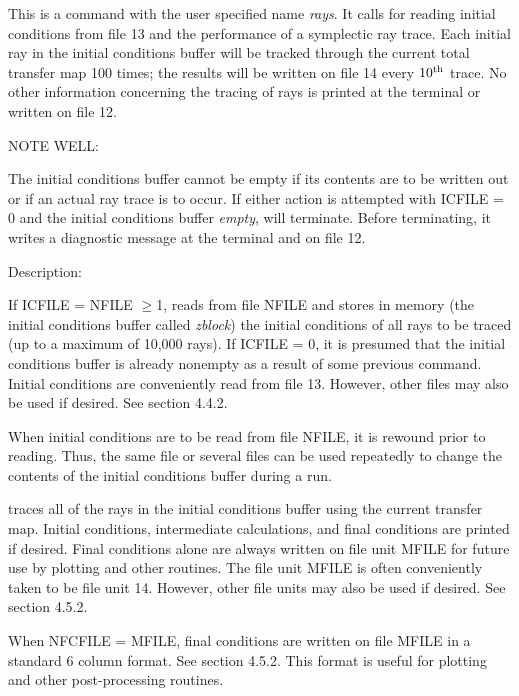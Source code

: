 This is a command with the user specified name {\em rays}.  It calls for reading
initial conditions from file 13 and the performance of a symplectic ray
trace.  Each initial ray in the initial conditions buffer will be tracked
through the current total transfer map 100 times; the results will be
written on file 14 every $10^{\mbox{\scriptsize th}}$ trace.  No other information concerning the
tracing of rays is printed at the terminal or written on file 12.

\vspace{5mm}
     NOTE WELL:
\vspace{2mm}

         The initial conditions buffer cannot be empty if its contents are
to be written out or if an actual ray trace is to occur.  If either action
is attempted with ICFILE = 0 and the initial conditions buffer {\em empty},
\Mary will terminate.  Before terminating, it writes a diagnostic message
at the terminal and on file 12.

\vspace{5mm}
     Description:
\vspace{2mm}

     If ICFILE = NFILE $\geq$1, \Mary reads from file NFILE and stores in
memory (the initial conditions buffer called {\em zblock}) the initial conditions of all rays
to be traced (up to a maximum of 10,000 rays).   If ICFILE = 0, it is
presumed that the initial conditions buffer is already nonempty as a result
of some previous command.  Initial conditions are conveniently read from
file 13.  However, other files may also be used if desired.  See section
4.4.2.

     When initial conditions are to be read from file NFILE, it is rewound
prior to reading.  Thus, the same file or several files can be used
repeatedly to change the contents of the initial conditions buffer during a
\Mary run.

     \Mary traces all of the rays in the initial conditions buffer using
the current transfer map.  Initial conditions, intermediate calculations,
and final conditions are printed if desired.  Final conditions alone are
always written on file unit MFILE for future use by plotting and other
routines.  The file unit MFILE is often conveniently taken to be file unit
14.  However, other file units may also be used if desired.  See section
4.5.2.

     When NFCFILE = MFILE, final conditions are written on file MFILE in a
standard 6 column format.  See section 4.5.2.  This format is useful for
plotting and other post-processing routines.

